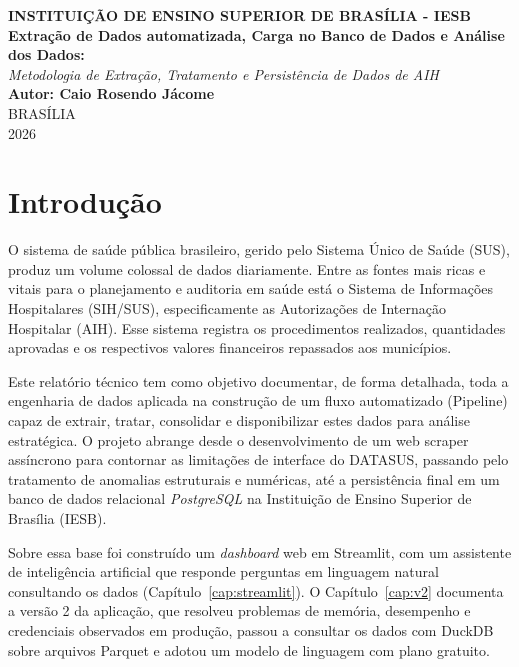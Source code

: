 \documentclass[12pt,a4paper]{report}
\begin{document}
\begin{titlepage}
\begin{center}
\large \textbf{INSTITUIÇÃO DE ENSINO SUPERIOR DE BRASÍLIA - IESB}\\
\vspace{4cm}
\Large \textbf{Extração de Dados automatizada, Carga no Banco de Dados e Análise dos Dados:}\\
\large \textit{Metodologia de Extração, Tratamento e Persistência de Dados de AIH}\\
\vspace{4cm}
\large \textbf{Autor: Caio Rosendo Jácome}\\
\vfill
\large BRASÍLIA\\
2026
\end{center}
\end{titlepage}

\tableofcontents

\chapter{Introdução}
O sistema de saúde pública brasileiro, gerido pelo Sistema Único de Saúde (SUS), produz um volume colossal de dados diariamente. Entre as fontes mais ricas e vitais para o planejamento e auditoria em saúde está o Sistema de Informações Hospitalares (SIH/SUS), especificamente as Autorizações de Internação Hospitalar (AIH). Esse sistema registra os procedimentos realizados, quantidades aprovadas e os respectivos valores financeiros repassados aos municípios.

Este relatório técnico tem como objetivo documentar, de forma detalhada, toda a engenharia de dados aplicada na construção de um fluxo automatizado (Pipeline) capaz de extrair, tratar, consolidar e disponibilizar estes dados para análise estratégica. O projeto abrange desde o desenvolvimento de um web scraper assíncrono para contornar as limitações de interface do DATASUS, passando pelo tratamento de anomalias estruturais e numéricas, até a persistência final em um banco de dados relacional \textit{PostgreSQL} na Instituição de Ensino Superior de Brasília (IESB).

Sobre essa base foi construído um \textit{dashboard} web em Streamlit, com um assistente de inteligência artificial que responde perguntas em linguagem natural consultando os dados (Capítulo~\ref{cap:streamlit}). O Capítulo~\ref{cap:v2} documenta a versão 2 da aplicação, que resolveu problemas de memória, desempenho e credenciais observados em produção, passou a consultar os dados com DuckDB sobre arquivos Parquet e adotou um modelo de linguagem com plano gratuito.
\end{document}
